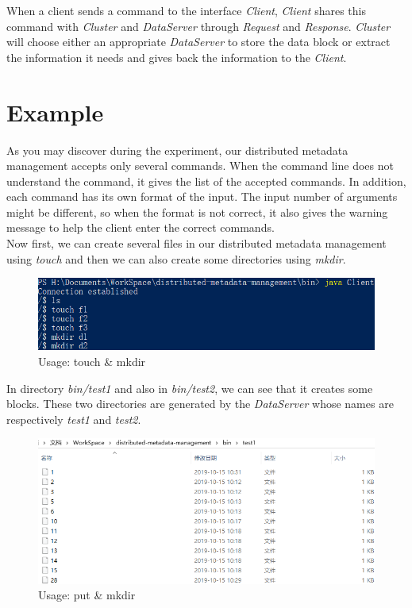\documentclass[10pt]{article}
\begin{document}
When a client sends a command to the interface \textit{Client}, 
\textit{Client} shares this command with \textit{Cluster} and \textit{DataServer} through \textit{Request} and \textit{Response}. 
\textit{Cluster} will choose either an appropriate \textit{DataServer} to store the data block or extract the information it 
needs and gives back the information to the \textit{Client}.
\section{Example}

As you may discover during the experiment, our distributed metadata management accepts only several commands. 
When the command line does not understand the command, it gives the list of the accepted commands. 
In addition, each command has its own format of the input. The input number of arguments might be different, 
so when the format is not correct, it also gives the warning message to help the client enter the correct commands.\\ 
Now first, we can create several files in our distributed metadata management using \textit{touch} 
and then we can also create some directories using \textit{mkdir}.

\begin{figure}[H]
\centerline{\includegraphics[width = 1\textwidth]{images//1 create.png}}
\caption{Usage: touch \& mkdir}
\end{figure}

In directory \textit{bin/test1} and also in \textit{bin/test2}, we can see that it creates some blocks. 
These two directories are generated by the \textit{DataServer} whose names are respectively \textit{test1} and \textit{test2}.

\begin{figure}[H]
\centerline{\includegraphics[width = 1\textwidth]{images//10 files.png}}
\caption{Usage: put \& mkdir}
\end{figure}
\end{document}
